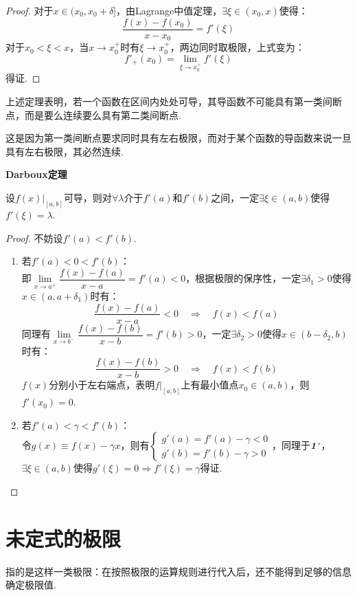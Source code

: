 \begin{proof}
    对于$x \in (x_0,x_0+\delta]$，由Lagrange中值定理，$\exists \xi \in (x_0,x)$使得：
    \[\frac{f(x)-f(x_0)}{x-x_0} = f'(\xi)\]
    对于$x_0 < \xi < x$，当$x \to x_0^+$时有$\xi \to x_0^+$，两边同时取极限，上式变为：
    \[f'_+(x_0) = \lim\limits_{\xi \to x_0^+}  f'(\xi)\]
    得证.
\end{proof}

上述定理表明，若一个函数在区间内处处可导，其导函数不可能具有第一类间断点，而是要么连续要么具有第二类间断点.

这是因为第一类间断点要求同时具有左右极限，而对于某个函数的导函数来说一旦具有左右极限，其必然连续.

\begin{theorem}
    \textbf{Darboux定理}
    
    设$\left.f(x)\right|_{[a,b]}$可导，则对$\forall \lambda$介于$f'(a)$和$f'(b)$之间，一定$\exists \xi \in (a,b)$使得$f'(\xi) = \lambda$.
\end{theorem}

\begin{proof}
    不妨设$f'(a)<f'(b)$.
    \begin{enumerate}[circ]
        \item 若$f'(a)<0<f'(b)$：\\
        即$\lim\limits_{x \to a^+}\dfrac{f(x)-f(a)}{x-a} = f'(a) < 0$，根据极限的保序性，一定$\exists \delta_1 > 0$使得$x \in (a,a+\delta_1)$时有：
        \[\frac{f(x)-f(a)}{x-a}<0 \quad\Rightarrow\quad f(x)<f(a)\]
        同理有$\lim\limits_{x \to b^-}\dfrac{f(x)-f(b)}{x-b} = f'(b) > 0$，一定$\exists \delta_2 > 0$使得$x \in (b-\delta_2,b)$时有：
        \[\frac{f(x)-f(b)}{x-b}>0 \quad\Rightarrow\quad f(x)<f(b)\]
        $f(x)$分别小于左右端点，表明$\left.f\right|_{[a,b]}$上有最小值点$x_0 \in (a,b)$，则$f'(x_0) = 0$.
        \item 若$f'(a)<\gamma<f'(b)$：\\
        令$g(x) \equiv f(x)-\gamma x$，则有$\begin{cases}
            g'(a) = f'(a) - \gamma < 0\\
            g'(b) = f'(b) - \gamma > 0
        \end{cases}$，同理于{\itshape\bfseries{1${\,}^\circ$}}，$\exists \xi \in (a,b)$使得$g'(\xi)=0\Rightarrow f'(\xi)=\gamma$得证.
    \end{enumerate}
\end{proof}


\section{未定式的极限}
\begin{definition}
    指的是这样一类极限：在按照极限的运算规则进行代入后，还不能得到足够的信息确定极限值.
\end{definition}


